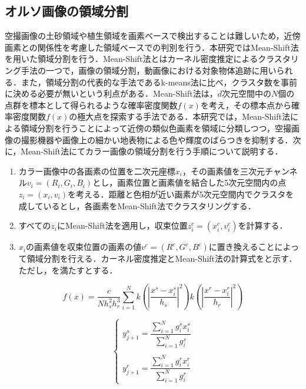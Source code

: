     \subsection{オルソ画像の領域分割}
      \label{オルソ画像の領域分割}
      空撮画像の土砂領域や植生領域を画素ベースで検出することは難しいため，近傍画素との関係性を考慮した領域ベースでの判別を行う．本研究ではMean-Shift法\cite{Mean-Shift法1, Mean-Shift法2}を用いた領域分割を行う．Mean-Shift法とはカーネル密度推定によるクラスタリング手法の一つで，画像の領域分割，動画像における対象物体追跡に用いられる．また，領域分割の代表的な手法であるk-means法\cite{k-means法}に比べ，クラスタ数を事前に決める必要が無いという利点がある．Mean-Shift法は，$d$次元空間中の$N$個の点群を標本として得られるような確率密度関数$f(x)$を考え，その標本点から確率密度関数$f(x)$の極大点を探索する手法である．本研究では，Mean-Shift法による領域分割を行うことによって近傍の類似色画素を領域に分類しつつ，空撮画像の撮影機器や画像上の細かい地表物による色や輝度のばらつきを抑制する．次に，Mean-Shift法にてカラー画像の領域分割を行う手順について説明する．

      \begin{enumerate}
        \setlength{\itemsep}{-5pt}
        \item カラー画像中の各画素の位置を二次元座標$x_i$，その画素値を三次元チャンネル$v_{i} =(R_{i},G_{i},B_{i})$とし，画素位置と画素値を結合した5次元空間内の点$z_{i} = (x_{i}, v_{i})$を考える．距離と色相が近い画素が5次元空間内でクラスタを成しているとし，各画素をMean-Shift法でクラスタリングする．
        \item すべての$z_{i}$にMean-Shift法を適用し，収束位置$z_{i}^c = (x_{i}^c, v_{i}^c)$を計算する．
        \item $x_{i}$の画素値を収束位置の画素の値$v^c = (R^c, G^c, B^c)$に置き換えることによって領域分割を行える．カーネル密度推定とMean-Shift法の計算式をと示す．ただし，を満たすとする．
      \end{enumerate}
    
      \begin{equation}
        \label{Mean-Shift法1}
        f(x) = \dfrac{c} {N h_{s}^2 h_{r}^3}
          \sum_{i=1}^{N}
          k (|\dfrac{x^s - x_{i}^s} {h_{s}}|^2) k (|\dfrac{x^r - x_{i}^r} {h_{r}}|^2)
      \end{equation}

      \begin{equation}
        \label{Mean-Shift法2}
        \left\{
          \begin{array}{l}
            y_{j+1}^s = 
              \dfrac{\sum_{i=1}^{N} g_{i}^s x_{i}^s} {\sum_{i=1}^{N} g_{i}^s} \\ \\
            y_{j+1}^r = 
              \dfrac{\sum_{i=1}^{N} g_{i}^r x_{i}^r} {\sum_{i=1}^{N} g_{i}^r}
          \end{array}
        \right.
      \end{equation}

